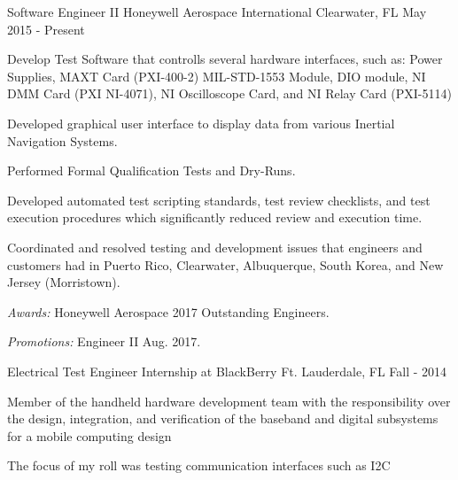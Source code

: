 

\begin{cventries}

  \cventry
    {Software Engineer II} %
    {Honeywell Aerospace International} %
    {Clearwater, FL} %
    {May 2015 - Present} %
    {
      \begin{cvitems} %
				\item {Develop Test Software that controlls several hardware interfaces, such as: Power Supplies, MAXT Card (PXI-400-2) MIL-STD-1553 Module, DIO module, NI DMM Card (PXI NI-4071), NI Oscilloscope Card, and NI Relay Card (PXI-5114)}
				\item {Developed graphical user interface to display data from various Inertial Navigation Systems.}
				\item {Performed Formal Qualification Tests and Dry-Runs.}
				\item {Developed automated test scripting standards, test review checklists, and test execution procedures which significantly reduced review and execution time.}
				\item {Coordinated and resolved testing and development issues that engineers and customers had in Puerto Rico, Clearwater, Albuquerque, South Korea, and New Jersey (Morristown).}
				\item {{\it Awards:} Honeywell Aerospace 2017 Outstanding Engineers.}
				\item {{\it Promotions:} Engineer II Aug. 2017.}
      \end{cvitems}
    }

	\cventry
		{Electrical Test Engineer} %
		{Internship at BlackBerry} %
		{Ft. Lauderdale, FL} %
		{Fall - 2014} %
		{
			\begin{cvitems} %
			\item {Member of the handheld hardware development team with the responsibility over the design, integration, and verification of the baseband and digital subsystems for a mobile computing design}
			\item {The focus of my roll was testing communication interfaces such as I2C}
			\end{cvitems}
		}
\end{cventries}
